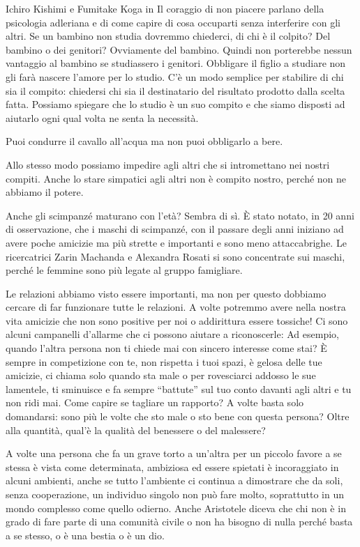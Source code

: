 \documentclass[12pt]{book} %
\begin{document}
Ichiro Kishimi e Fumitake Koga in Il coraggio di non piacere parlano
della psicologia adleriana e di come capire di cosa occuparti senza interferire con gli altri. Se un bambino non studia
dovremmo chiederci, di chi è il colpito? Del bambino o dei genitori? Ovviamente del bambino. Quindi non porterebbe
nessun vantaggio al bambino se studiassero i genitori. Obbligare il figlio a studiare non gli farà nascere l'amore per
lo studio. C'è un modo semplice per stabilire di chi sia il compito: chiedersi chi sia il
destinatario del risultato prodotto dalla scelta fatta. Possiamo spiegare che lo studio è un suo compito e che siamo
disposti ad aiutarlo ogni qual volta ne senta la necessità.

Puoi condurre il cavallo all'acqua ma non puoi obbligarlo a bere.

Allo stesso modo possiamo impedire agli altri che si intromettano nei nostri compiti. Anche lo stare simpatici agli
altri non è compito nostro, perché non ne abbiamo il potere.

\begin{mdframed}[linewidth=1pt]
Anche gli scimpanzé maturano con l'età? Sembra di sì. È stato notato, in 20 anni di
osservazione, che i maschi di scimpanzé, con il passare degli anni iniziano ad avere poche amicizie ma più strette e
importanti e sono meno attaccabrighe. Le ricercatrici Zarin Machanda e Alexandra Rosati si sono concentrate sui maschi,
perché le femmine sono più legate al gruppo famigliare. 
\end{mdframed}

Le relazioni abbiamo visto essere importanti, ma non per questo dobbiamo cercare di far funzionare tutte le relazioni. A
volte potremmo avere nella nostra vita amicizie che non sono positive per noi o addirittura essere tossiche! Ci sono
alcuni campanelli d'allarme che ci possono aiutare a riconoscerle: Ad esempio, quando
l'altra persona non ti chiede mai con sincero interesse come stai? È sempre in competizione con
te, non rispetta i tuoi spazi, è gelosa delle tue amicizie, ci chiama solo quando sta male o per rovesciarci addosso le
sue lamentele, ti sminuisce e fa sempre “battute” sul tuo conto davanti agli altri e tu non ridi mai.
Come capire se tagliare un rapporto? A volte basta solo domandarsi: sono più le volte che sto male o sto bene con questa persona? Oltre alla quantità, qual'è la qualità del benessere o del malessere?

A volte una persona che fa un grave torto a un'altra per un piccolo favore a se stessa è vista come
determinata, ambiziosa ed essere spietati è incoraggiato in alcuni ambienti, anche se tutto
l'ambiente ci continua a dimostrare che da soli, senza cooperazione, un individuo singolo non può
fare molto, soprattutto in un mondo complesso come quello odierno.
Anche Aristotele diceva che chi non è in grado
di fare parte di una comunità civile o non ha bisogno di nulla perché basta a se stesso, o è una bestia o è un dio.
\end{document}
